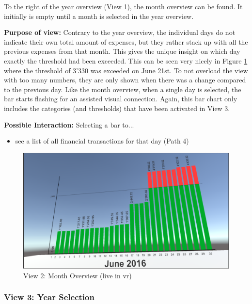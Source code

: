 To the right of the year overview (View 1), the month overview can be found. It initially is empty until a month is selected in the year overview.

\textbf{Purpose of view:} Contrary to the year overview, the individual days do not indicate their own total amount of expenses, but they rather stack up with all the previous expenses from that month. This gives the unique insight on which day exactly the threshold had been exceeded. This can be seen very nicely in Figure \ref{fig:unityview2} where the threshold of 3'330 was exceeded on June 21st. To not overload the view with too many numbers, they are only shown when there was a change compared to the previous day. Like the month overview, when a single day is selected, the bar starts flashing for an assisted visual connection. Again, this bar chart only includes the categories (and thresholds) that have been activated in View 3.

\textbf{Possible Interaction:} Selecting a bar to...
\begin{itemize}[noitemsep,nolistsep]
	\item see a list of all financial transactions for that day (Path 4)
\end{itemize}

\begin{figure}[t]
	\begin{center}
		\includegraphics[width=12cm]{03_Figures/08_Development/View2_MonthOverview.png}
		\caption{View 2: Month Overview (live in \gls{vr})}
		\label{fig:unityview2}
	\end{center}
\end{figure}


\subsubsection{View 3: Year Selection}

